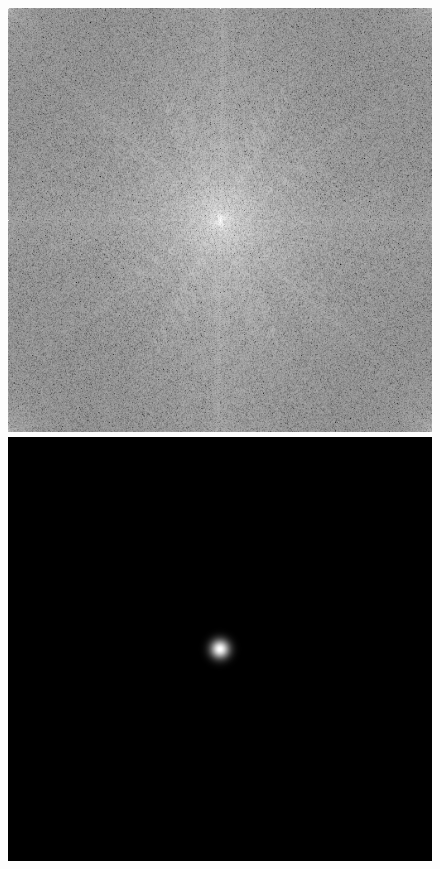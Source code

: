 \documentclass[twoside,twocolumn]{article}
\begin{document}
\begin{figure}[H]
\begin{center}
	\includegraphics[scale=.19]{figures/butterfly_mag_spec_8.png}
	\includegraphics[scale=.19]{figures/butterfly_gau_filter_8.png}

\end{center}
\end{figure}
\end{document}
